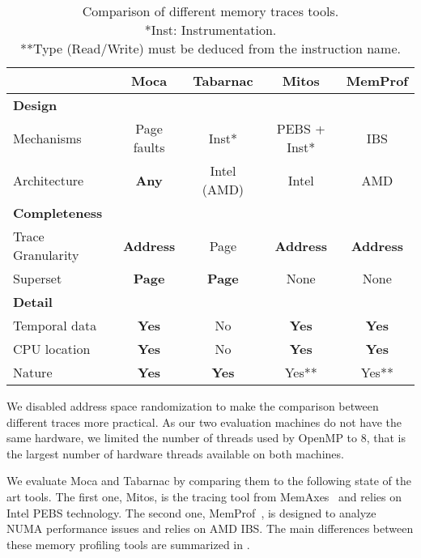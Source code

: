 \begin{table}[htb]
    \centering
    \begin{tabular}{lcccc}
        \toprule
         & \textbf{Moca} & \textbf{Tabarnac} & \textbf{Mitos} & \textbf{MemProf} \\
            \midrule
            \textbf{Design} & & & &\\
            \midrule
            Mechanisms   & Page faults  & Inst* & PEBS + Inst* & IBS \\
            Architecture & \textbf{Any} & Intel (AMD) & Intel & AMD   \\
            \midrule
            \textbf{Completeness} & & & &\\
            \midrule
            Trace Granularity & \textbf{Address} & Page          & \textbf{Address} & \textbf{Address} \\
            Superset          & \textbf{Page} & \textbf{Page} & None             & None             \\
            \midrule
            \textbf{Detail} & & & &\\
            \midrule
            Temporal data & \textbf{Yes} & No          & \textbf{Yes} & \textbf{Yes} \\
            CPU location  & \textbf{Yes} & No          & \textbf{Yes} & \textbf{Yes} \\
            Nature        & \textbf{Yes} &\textbf{Yes} & Yes**         & Yes**       \\
        \bottomrule
    \end{tabular}
    \caption[Comparison of different memory traces tools.]
    {Comparison of different memory traces tools.\\
        \footnotesize{
            *Inst: Instrumentation.\\
            **Type (Read/Write) must be deduced from the instruction name.
        }
    }
    \label{tab:tools-comp}
\end{table}


We disabled address space randomization to make the comparison between different traces more practical.
As our two evaluation machines do not have the same hardware, we limited the number of threads used by \gls{OpenMP} to $8$, that is the largest number of hardware threads available on both machines.

We evaluate \gls{Moca} and \gls{Tabarnac} by comparing them to the following state of the art tools. The first one,
\gls{Mitos}, is the tracing tool from \gls{MemAxes}~\cite{Gimenez14Dissecting} and relies on \gls{Intel} \gls{PEBS} technology.
The second one, \gls{MemProf}~\cite{Lachaize12MemProf}, is designed to analyze \gls{NUMA} performance issues and relies on \gls{AMD} \gls{IBS}.
The main differences between these memory profiling tools are summarized in .

